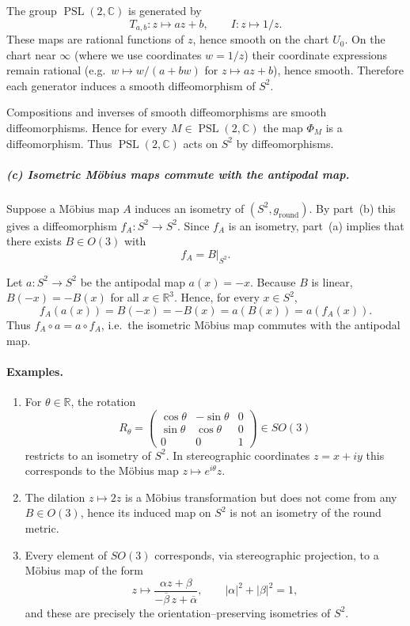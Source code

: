 \documentclass[12pt,a4paper]{article}
\theoremstyle{plain}
\theoremstyle{definition}      %
\begin{document}
	The group $\operatorname{PSL}(2,\mathbb{C})$ is generated by
	\[
	T_{a,b}:z\mapsto az+b,\qquad I:z\mapsto 1/z.
	\]
	These maps are rational functions of $z$, hence smooth on the chart $U_0$.
	On the chart near $\infty$ (where we use coordinates $w=1/z$) their coordinate expressions
	remain rational (e.g.\ $w\mapsto w/(a+bw)$ for $z\mapsto az+b$), hence smooth.
	Therefore each generator induces a smooth diffeomorphism of $S^{2}$.
	
	Compositions and inverses of smooth diffeomorphisms are smooth diffeomorphisms.
	Hence for every $M\in\operatorname{PSL}(2,\mathbb{C})$ the map $\Phi_M$ is a diffeomorphism.
	Thus $\operatorname{PSL}(2,\mathbb{C})$ acts on $S^{2}$ by diffeomorphisms.
	
	\subparagraph{(c) Isometric M\"obius maps commute with the antipodal map.}
	
	Suppose a M\"obius map $A$ induces an isometry of $(S^{2},g_{\mathrm{round}})$.
	By part~(b) this gives a diffeomorphism $f_A:S^{2}\to S^{2}$.
	Since $f_A$ is an isometry, part~(a) implies that there exists $B\in O(3)$ with
	\[
	f_A = B|_{S^{2}}.
	\]
	
	Let $a:S^{2}\to S^{2}$ be the antipodal map $a(x)=-x$.
	Because $B$ is linear, $B(-x)=-B(x)$ for all $x\in\mathbb{R}^{3}$.
	Hence, for every $x\in S^{2}$,
	\[
	f_A(a(x)) = B(-x) = -B(x) = a(B(x)) = a(f_A(x)).
	\]
	Thus $f_A\circ a = a\circ f_A$, i.e.\ the isometric M\"obius map commutes with the antipodal map.
	
	\paragraph{Examples.}
	
	\begin{enumerate}
		\item For $\theta\in\mathbb{R}$, the rotation
		\[
		R_\theta = \begin{pmatrix}
			\cos\theta & -\sin\theta & 0\\
			\sin\theta & \cos\theta & 0\\
			0          & 0          & 1
		\end{pmatrix}\in SO(3)
		\]
		restricts to an isometry of $S^{2}$. In stereographic coordinates $z=x+iy$ this corresponds
		to the M\"obius map $z\mapsto e^{i\theta}z$.
		\item The dilation $z\mapsto 2z$ is a M\"obius transformation but does not come from any
		$B\in O(3)$, hence its induced map on $S^{2}$ is not an isometry of the round metric.
		\item Every element of $SO(3)$ corresponds, via stereographic projection, to a M\"obius map of the form
		\[
		z\longmapsto \frac{\alpha z+\beta}{-\overline{\beta}\,z+\overline{\alpha}},\qquad
		|\alpha|^{2}+|\beta|^{2}=1,
		\]
		and these are precisely the orientation--preserving isometries of $S^{2}$.
	\end{enumerate}
	
\end{document}
